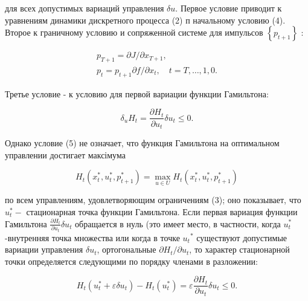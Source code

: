 \documentclass[10pt]{article}
\begin{document}
для всех допустимых вариаций управления $\delta u$. Первое условие приводит к уравнениям динамики дискретного процесса (2) п начальному условию (4). Второе к граничному условию и сопряженной системе для импульсов $\left\{p_{t+1}\right\}$ :



\[

\begin{gathered}

p_{T+1}=\partial J / \partial x_{T+1}, \\

p_{t}=p_{t+1} \partial f / \partial x_{t}, \quad t=T, \ldots, 1,0 .

\end{gathered}

\]



Третье условие - к условию для первой вариации функции Гамильтона:



\[

\delta_{u} H_{t}=\frac{\partial H_{t}}{\partial u_{t}} \delta u_{t} \leqslant 0 .

\]



Однако условие (5) не означает, что функция Гамильтона на оптимальном управлении достигает максімума



\[

H_{t}\left(x_{t}^{*}, u_{t}^{*}, p_{t+1}^{*}\right)=\max _{u \in U} H_{t}\left(x_{t}^{*}, u_{t}^{*}, p_{t+1}^{*}\right)

\]



по всем управлениям, удовлетворяющим ограничениям (3); оно показывает, что $u_{t}^{*}-$ стационарная точка функции Гамильтона. Если первая вариация функции Гамильтона $\frac{\partial H_{t}}{\partial u_{t}} \delta u_{t}$ обращается в нуль (это имеет место, в частности, когда $u_{t}^{*}$-внутренняя точка множества или когда в точке $u_{t}{ }^{*}$ существуют допустимые вариации управления $\delta u_{t}$, ортогональные $\partial H_{t} / \partial u_{t}$, то характер стационарной точки определяется следующими по порядку членами в разложении:



\[

H_{t}\left(u_{t}^{*}+\varepsilon \delta u_{t}\right)-H_{t}\left(u_{t}^{*}\right)=\varepsilon \frac{\partial H_{t}}{\partial u_{t}} \delta u_{t} \leqslant 0 .

\]
\end{document}
